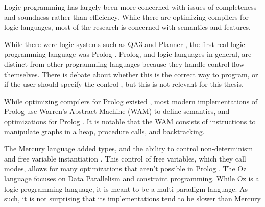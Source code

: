 
Logic programming has largely been more concerned with issues of completeness and soundness rather than efficiency.
While there are optimizing compilers for logic languages, most of the research is concerned with semantics and features.

While there were logic systems such as QA3 and Planner \cite{history_LP}, 
the first real logic programming language was Prolog \cite{prolog}.
Prolog, and logic languages in general, are distinct from other programming languages because they
handle control flow themselves.
There is debate about whether this is the correct way to program, 
or if the user should specify the control \cite{history_LP,planner},
but this is not relevant for this thesis.

While optimizing compilers for Prolog existed \cite{dec}, most modern implementations of Prolog 
use Warren's Abstract Machine (WAM) \cite{wam}
to define semantics, and optimizations for Prolog \cite{yap, sicstus}.
It is notable that the WAM consists of instructions to manipulate graphs in a heap,
procedure calls, and backtracking.

The Mercury language added types, and the ability to control
non-determinism and free variable instantiation \cite{mercury}.
This control of free variables, which they call modes, allows for many optimizations
that aren't possible in Prolog \cite{mercury}.
The Oz language focuses on Data Parallelism and constraint programming.
While Oz is a logic programming language, it is meant to be a multi-paradigm language.
As such, it is not surprising that its implementations tend
to be slower than Mercury \cite{mercury, oz}

